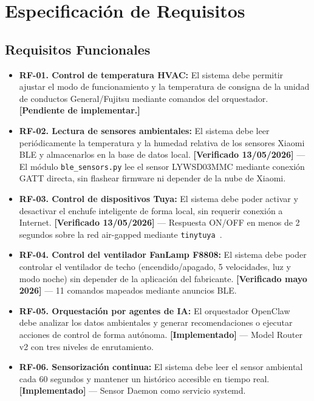\chapter{Especificación de Requisitos}
\label{cap:requisitos}

\section{Requisitos Funcionales}

\begin{itemize}
    \item \textbf{RF-01. Control de temperatura HVAC:} El sistema debe permitir ajustar el modo de funcionamiento y la temperatura de consigna de la unidad de conductos General/Fujitsu mediante comandos del orquestador. \textbf{[Pendiente de implementar.]}

    \item \textbf{RF-02. Lectura de sensores ambientales:} El sistema debe leer periódicamente la temperatura y la humedad relativa de los sensores Xiaomi BLE y almacenarlos en la base de datos local. \textbf{[Verificado 13/05/2026]} --- El módulo \texttt{ble\_sensors.py} lee el sensor LYWSD03MMC mediante conexión GATT directa, sin flashear firmware ni depender de la nube de Xiaomi.

    \item \textbf{RF-03. Control de dispositivos Tuya:} El sistema debe poder activar y desactivar el enchufe inteligente de forma local, sin requerir conexión a Internet. \textbf{[Verificado 13/05/2026]} --- Respuesta ON/OFF en menos de 2 segundos sobre la red air-gapped mediante \texttt{tinytuya}~\cite{tinytuya}.

    \item \textbf{RF-04. Control del ventilador FanLamp F8808:} El sistema debe poder controlar el ventilador de techo (encendido/apagado, 5 velocidades, luz y modo noche) sin depender de la aplicación del fabricante. \textbf{[Verificado mayo 2026]} --- 11 comandos mapeados mediante anuncios BLE.

    \item \textbf{RF-05. Orquestación por agentes de IA:} El orquestador OpenClaw~\cite{openclaw} debe analizar los datos ambientales y generar recomendaciones o ejecutar acciones de control de forma autónoma. \textbf{[Implementado]} --- Model Router v2 con tres niveles de enrutamiento.

    \item \textbf{RF-06. Sensorización continua:} El sistema debe leer el sensor ambiental cada 60 segundos y mantener un histórico accesible en tiempo real. \textbf{[Implementado]} --- Sensor Daemon como servicio systemd.


\end{itemize}
